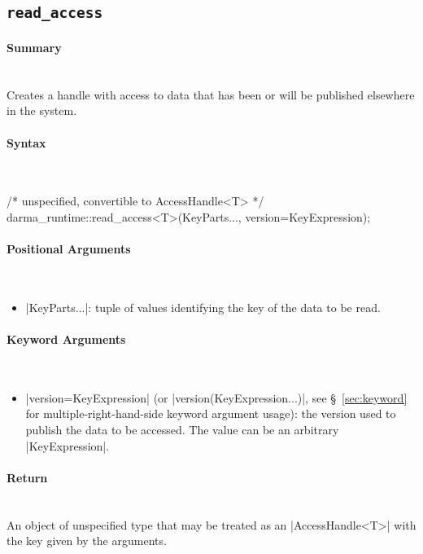 \subsection{\texttt{read\_access}}
\label{ssec:api_fe_read_access}

\paragraph{Summary}\mbox{}\\
Creates a handle with  access to data that has been or will be
published elsewhere in the system.

\paragraph{Syntax}\mbox{}\\
\begin{CppCode}
/* unspecified, convertible to AccessHandle<T> */
darma_runtime::read_access<T>(KeyParts..., version=KeyExpression);
\end{CppCode}

\paragraph{Positional Arguments}\mbox{}\\
\begin{itemize}
  \item |KeyParts...|: tuple of values identifying the key of the data to
  be read.
\end{itemize}

\paragraph{Keyword Arguments}\mbox{}\\
\begin{itemize}
  \item |version=KeyExpression| (or |version(KeyExpression...)|,
see \S~\ref{sec:keyword} for multiple-right-hand-side keyword argument usage):
the version used to publish the data to be accessed.
The value can be an arbitrary |KeyExpression|.
\end{itemize}


\paragraph{Return}\mbox{}\\
An object of unspecified type that may be treated as an |AccessHandle<T>|
with the key given by the arguments.

